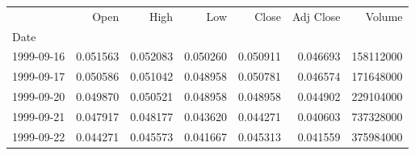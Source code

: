 \begin{tabular}{lrrrrrr}
\toprule
{} &      Open &      High &       Low &     Close &  Adj Close &     Volume \\
Date       &           &           &           &           &            &            \\
\midrule
1999-09-16 &  0.051563 &  0.052083 &  0.050260 &  0.050911 &   0.046693 &  158112000 \\
1999-09-17 &  0.050586 &  0.051042 &  0.048958 &  0.050781 &   0.046574 &  171648000 \\
1999-09-20 &  0.049870 &  0.050521 &  0.048958 &  0.048958 &   0.044902 &  229104000 \\
1999-09-21 &  0.047917 &  0.048177 &  0.043620 &  0.044271 &   0.040603 &  737328000 \\
1999-09-22 &  0.044271 &  0.045573 &  0.041667 &  0.045313 &   0.041559 &  375984000 \\
\bottomrule
\end{tabular}
